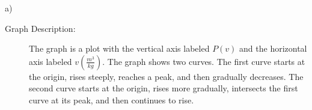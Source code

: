 a)

\begin{description}
    \item[Graph Description:] The graph is a plot with the vertical axis labeled \( P(v) \) and the horizontal axis labeled \( v \left( \frac{m^3}{kg} \right) \). The graph shows two curves. The first curve starts at the origin, rises steeply, reaches a peak, and then gradually decreases. The second curve starts at the origin, rises more gradually, intersects the first curve at its peak, and then continues to rise.
\end{description}